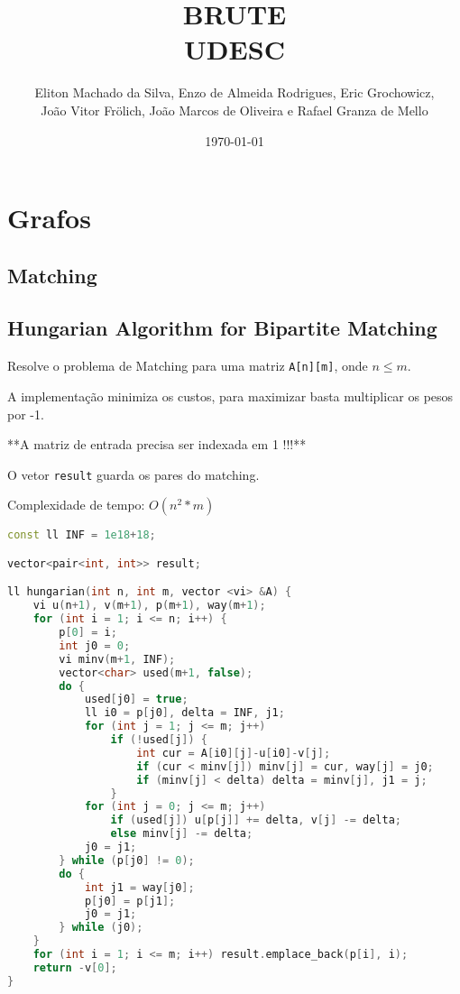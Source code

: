 \documentclass[11pt, a4paper, twoside]{article}
\title{BRUTE \\ UDESC}
\author{Eliton Machado da Silva, Enzo de Almeida Rodrigues, Eric Grochowicz, \\ João Vitor Frölich, João Marcos de Oliveira e Rafael Granza de Mello}
\begin{document}
\date{\today}
\maketitle


\renewcommand{\contentsname}{Índice} %
\tableofcontents
\newpage
%
%
%
%

\section{Grafos}

\subsection{Matching}

\subsection{Hungarian Algorithm for Bipartite Matching}


Resolve o problema de Matching para uma matriz \lstinline{A[n][m]}, onde $n \leq m$.

A implementação minimiza os custos, para maximizar basta multiplicar os pesos por -1.

**A matriz de entrada precisa ser indexada em 1 !!!**

O vetor \lstinline{result} guarda os pares do matching.

Complexidade de tempo: $O(n^2 * m)$

\begin{lstlisting}[language=C++]
const ll INF = 1e18+18;

vector<pair<int, int>> result;

ll hungarian(int n, int m, vector <vi> &A) {
    vi u(n+1), v(m+1), p(m+1), way(m+1);
    for (int i = 1; i <= n; i++) {
        p[0] = i;
        int j0 = 0;
        vi minv(m+1, INF);
        vector<char> used(m+1, false);
        do {
            used[j0] = true;
            ll i0 = p[j0], delta = INF, j1;
            for (int j = 1; j <= m; j++)
                if (!used[j]) {
                    int cur = A[i0][j]-u[i0]-v[j];
                    if (cur < minv[j]) minv[j] = cur, way[j] = j0;
                    if (minv[j] < delta) delta = minv[j], j1 = j;
                }
            for (int j = 0; j <= m; j++)
                if (used[j]) u[p[j]] += delta, v[j] -= delta;
                else minv[j] -= delta;
            j0 = j1;
        } while (p[j0] != 0);
        do {
            int j1 = way[j0];
            p[j0] = p[j1];
            j0 = j1;
        } while (j0);
    }
    for (int i = 1; i <= m; i++) result.emplace_back(p[i], i);
    return -v[0];
}
\end{lstlisting}
\end{document}
